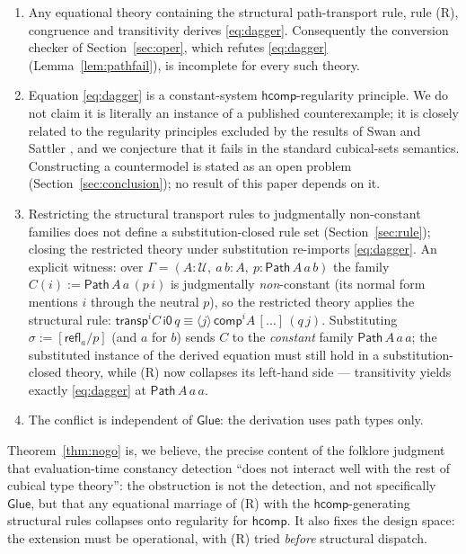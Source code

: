 \documentclass{lmcs}
\newcommand{\transp}{\mathsf{transp}}
\newcommand{\hcomp}{\mathsf{hcomp}}
\newcommand{\vcomp}{\mathsf{comp}}
\newcommand{\refl}{\mathsf{refl}}
\newcommand{\Glue}{\mathsf{Glue}}
\renewcommand{\conv}{\equiv}
\newcommand{\Path}{\mathsf{Path}}
\newcommand{\U}{\mathcal{U}}
\newcommand{\io}{\mathsf{i0}}
\begin{document}
\begin{thm}[No-go]\label{thm:nogo}
  \begin{enumerate}
  \item Any equational theory containing the structural
    path-transport rule, rule (R), congruence and transitivity
    derives \eqref{eq:dagger}.  Consequently the conversion checker
    of Section~\ref{sec:oper}, which refutes \eqref{eq:dagger}
    (Lemma~\ref{lem:pathfail}), is incomplete for every such theory.
  \item Equation \eqref{eq:dagger} is a constant-system
    $\hcomp$-regularity principle.  We do not claim it is literally
    an instance of a published counterexample; it is closely related
    to the regularity principles excluded by the results of Swan
    \cite{SwanRegularity} and Sattler \cite{SattlerNote}, and we
    conjecture that it fails in the standard cubical-sets semantics.
    Constructing a countermodel is stated as an open problem
    (Section~\ref{sec:conclusion}); no result of this paper depends
    on it.
  \item Restricting the structural transport rules to judgmentally
    non-constant families does not define a substitution-closed rule
    set (Section~\ref{sec:rule}); closing the restricted theory under
    substitution re-imports \eqref{eq:dagger}.  An explicit witness:
    over $\Gamma = (A : \U,\ a\,b : A,\ p : \Path\,A\,a\,b)$ the
    family $C(i) := \Path\,A\,a\,(p\,i)$ is judgmentally
    \emph{non}-constant (its normal form mentions $i$ through the
    neutral $p$), so the restricted theory applies the structural
    rule:
    $\transp^i C\,\io\,q \conv
    \langle j \rangle\, \vcomp^i A\,[\ldots]\,(q\,j)$.
    Substituting $\sigma := [\refl_a / p]$ (and $a$ for $b$) sends
    $C$ to the \emph{constant} family $\Path\,A\,a\,a$; the
    substituted instance of the derived equation must still hold in
    a substitution-closed theory, while (R) now collapses its
    left-hand side --- transitivity yields exactly
    \eqref{eq:dagger} at $\Path\,A\,a\,a$.
  \item The conflict is independent of $\Glue$: the derivation uses
    path types only.
  \end{enumerate}
\end{thm}

\noindent Theorem~\ref{thm:nogo} is, we believe, the precise content
of the folklore judgment that evaluation-time constancy detection
``does not interact well with the rest of cubical type theory'': the
obstruction is not the detection, and not specifically $\Glue$, but
that any equational marriage of (R) with the $\hcomp$-generating
structural rules collapses onto regularity for $\hcomp$.  It also
fixes the design space: the extension must be operational, with (R)
tried \emph{before} structural dispatch.
\end{document}

